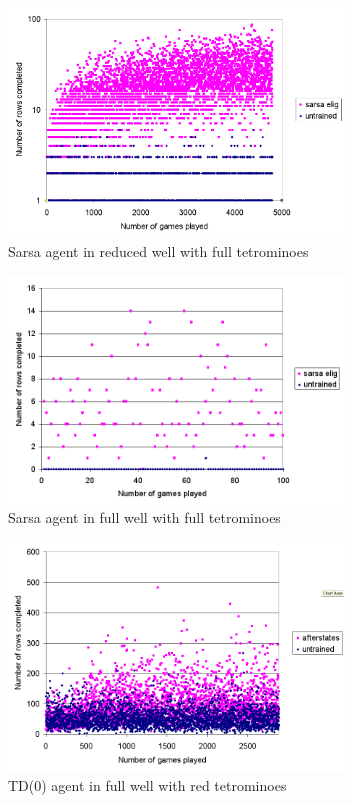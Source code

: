 \documentclass{rucsthesis}
\begin{document}
\begin{figure}[h]
\centering
\includegraphics[width=3.5in]{sarsaeligfulltetredwell.png}
\caption{Sarsa agent in reduced well with full tetrominoes}
\label{fig:sarsaeligfulltetredwell}
\end{figure}

\begin{figure}[h]
\centering
\includegraphics[width=3.5in]{sarsaeligfulltetfullwell.png}
\caption{Sarsa agent in full well with full tetrominoes}
\label{fig:sarsaeligfulltetfullwell}
\end{figure}

\begin{figure}[h]
\centering
\includegraphics[width=3.5in]{afterstatesheightredtetfullwell.png}
\caption{TD(0) agent in full well with red tetrominoes}
\label{fig:afterstatesheightredtetfullwell}
\end{figure}
\end{document}
